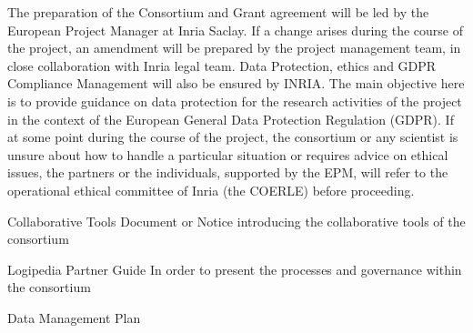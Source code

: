 \begin{workpackage}[id=management,type=MGT,wphases=1-48,
  short=Management,
  title=Management,
  lead=Inr,InrRM=36,BirRM=1,InnRM=1,SacRM=1,TumRM=1,IrtRM=1,LeeRM=1]
\begin{tasklist}
  \begin{task}[id=legal,title={Legal Management (data, ethics, GDPR)},wphases=1-48]
    The preparation of the Consortium and Grant agreement will be led
    by the European Project Manager at Inria Saclay. If a change
    arises during the course of the project, an amendment will be
    prepared by the project management team, in close collaboration
    with Inria legal team.  Data Protection, ethics and GDPR
    Compliance Management will also be ensured by INRIA. The main
    objective here is to provide guidance on data protection for the
    research activities of the project in the context of the European
    General Data Protection Regulation (GDPR). If at some point during
    the course of the project, the consortium or any scientist is
    unsure about how to handle a particular situation or requires
    advice on ethical issues, the partners or the individuals,
    supported by the EPM, will refer to the operational ethical
    committee of Inria (the COERLE) before proceeding.
  \end{task}

\end{tasklist}

\begin{wpdelivs}
  
  \begin{wpdeliv}[due=2,id=collab-tools,dissem=PU,nature=DEC,lead=Inr]{Collaborative Tools} Document or Notice introducing the collaborative tools of the consortium
  \end{wpdeliv}

  \begin{wpdeliv}[due=3,id=guide,dissem=PU,nature=R,lead=Inr]{Logipedia Partner Guide} In order to present the processes and governance within the consortium
  \end{wpdeliv}

  \begin{wpdeliv}[due=6,id=data-plan,dissem=PU,nature=R,lead=Inr]{Data Management Plan}
  \end{wpdeliv}
  
\end{wpdelivs}

\end{workpackage}


